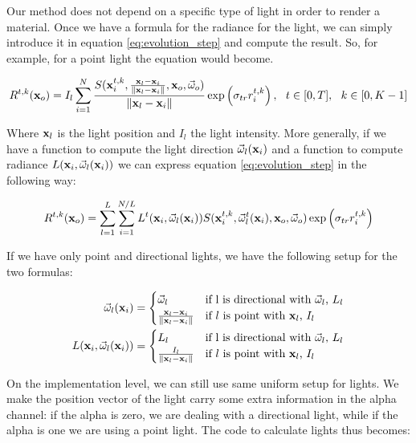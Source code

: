 Our method does not depend on a specific type of light in order to render a material. Once we have a formula for the radiance for the light, we can simply introduce it in equation \ref{eq:evolution_step} and compute the result. So, for example, for a point light the equation would become.

$$
R^{t,k}(\x_o) = {I_l} \sum_{i = 1}^N  \frac{S(\x^{t,k}_i, \frac{\x_l - \x_i}{\|\x_l - \x_i\|}, \x_o, \vomega_o)}{{\|\x_l - \x_i\|}} \exp\left(\sigma_{tr} r^{t,k}_i\right), \ \ t \in [0,T], \ \ k \in [0,K-1] 
\label{eq:evolution_step_2}
$$

Where $\mathbf{x}_l$ is the light position and $I_l$ the light intensity. More generally, if we have a function to compute the light direction $\vec{\omega}_l(\mathbf{x}_i)$ and a function to compute radiance $L(\mathbf{x}_i, \vec{\omega}_l(\mathbf{x}_i))$ we can express equation \ref{eq:evolution_step} in the following way:

$$
R^{t,k}(\mathbf{x}_o) = \sum_{l = 1}^L \sum_{i = 1}^{N/L} L^t(\mathbf{x}_i, \vec{\omega}_l(\mathbf{x}_i)) S(\mathbf{x}^{t,k}_i, \vec{\omega}_l^t(\mathbf{x}_i), \mathbf{x}_o, \vec{\omega}_o) \exp\left(\sigma_{tr} r^{t,k}_i\right)
$$

If we have only point and directional lights, we have the following setup for the two formulas:

\begin{equation*}
\begin{split}
\vec{\omega}_l(\mathbf{x}_i) &= \begin{cases}
\vec{\omega}_l & \text{if l is directional with $\vec{\omega}_l$, $L_l$} \\
 \frac{\mathbf{x}_l - \mathbf{x}_i}{\|\mathbf{x}_l - \mathbf{x}_i\|} & \text{if $l$ is point with $\mathbf{x}_l$, $I_l$}
\end{cases} \\
L(\mathbf{x}_i, \vec{\omega}_l(\mathbf{x}_i)) &= \begin{cases}
L_l & \text{if l is directional with $\vec{\omega}_l$, $L_l$} \\
 \frac{I_l}{\|\mathbf{x}_l - \mathbf{x}_i\|} & \text{if $l$ is point with $\mathbf{x}_l$, $I_l$}
\end{cases} \\
\end{split}
\end{equation*}

On the implementation level, we can still use same uniform setup for lights. We make the position vector of the light carry some extra information in the alpha channel: if the alpha is zero, we are dealing with a directional light, while if the alpha is one we are using a point light. The code to calculate lights thus becomes:

